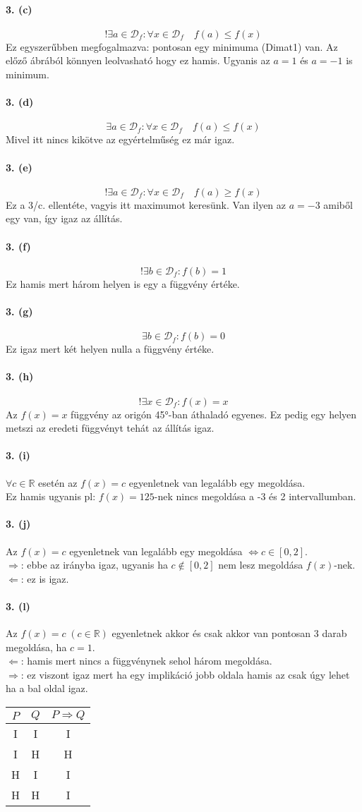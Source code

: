 \documentclass[12pt,a4paper,fleqn]{article}
\newcommand{\myparagraph}[1]{\paragraph{#1}\mbox{}}
\begin{document}
\myparagraph{3. (c)}
\[ !\exists a \in \mathcal{D}_f: \forall x \in \mathcal{D}_f \quad f(a) \leq f(x) \]
Ez egyszerűbben megfogalmazva: pontosan egy minimuma (Dimat1) van. Az előző ábrából
könnyen leolvasható hogy ez hamis. Ugyanis az $a=1$ és $a=-1$ is minimum.


\myparagraph{3. (d)}
\[ \exists a \in \mathcal{D}_f: \forall x \in \mathcal{D}_f \quad f(a) \leq f(x) \]
Mivel itt nincs kikötve az egyértelműség ez már igaz.


\myparagraph{3. (e)}
\[ !\exists a \in \mathcal{D}_f: \forall x \in \mathcal{D}_f \quad f(a) \geq f(x) \]
Ez a 3/c. ellentéte, vagyis itt maximumot keresünk. Van ilyen az $a=-3$ amiből
egy van, így igaz az állítás.


\myparagraph{3. (f)}
\[ !\exists b \in \mathcal{D}_f: f(b) = 1 \]
Ez hamis mert három helyen is egy a függvény értéke.

\myparagraph{3. (g)}
\[ \exists b \in \mathcal{D}_f: f(b) = 0 \]
Ez igaz mert két helyen nulla a függvény értéke.


\myparagraph{3. (h)}
\[ !\exists x \in \mathcal{D}_f: f(x) = x \]
Az $f(x) = x$ függvény az origón 45°-ban áthaladó egyenes. Ez pedig egy helyen
metszi az eredeti függvényt tehát az állítás igaz.


\myparagraph{3. (i)}
$\forall c \in \mathbb{R}$ esetén az $f(x) = c$ egyenletnek van legalább egy
megoldása. \\
Ez hamis ugyanis pl: $f(x)=125$-nek nincs megoldása a -3 és 2 intervallumban.

\myparagraph{3. (j)}
Az $f(x) = c$ egyenletnek van legalább egy megoldása $\iff c \in [0,2]$. \\
$\Rightarrow$: ebbe az irányba igaz, ugyanis ha $c \notin [0,2]$ nem lesz
megoldása $f(x)$-nek. \\
$\Leftarrow$: ez is igaz.


\myparagraph{3. (l)}
Az $f(x) = c \; (c \in \mathbb{R})$ egyenletnek akkor és csak akkor van pontosan 3
darab megoldása, ha $c = 1$. \\
$\Leftarrow$: hamis mert nincs a függvénynek sehol három megoldása. \\
$\Rightarrow$: ez viszont igaz mert ha egy implikáció jobb oldala hamis az csak
úgy lehet ha a bal oldal igaz. \\[1.3em]
\begin{tabular}{c|c|c}
  $P$ & $Q$ & $P \Rightarrow Q$ \\ \hline
  I & I & I \\ \hline
  I & H & H \\ \hline
  H & I & I \\ \hline
  H & H & I
\end{tabular}
\end{document}

